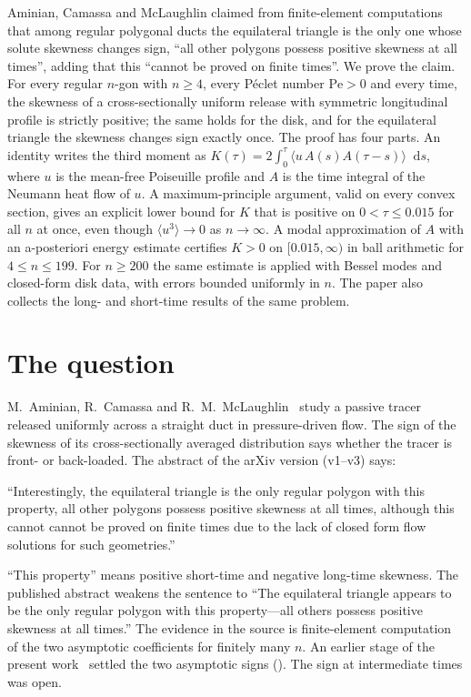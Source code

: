\documentclass[11pt,a4paper]{report}
\DeclareRobustCommand*{\dd}{\mathop{}\!\mathrm{d}}
\begin{document}
\makepapertitle

\begin{paperabstract}
Aminian, Camassa and McLaughlin claimed from finite-element computations that among regular polygonal ducts the
equilateral triangle is the only one whose solute skewness changes sign, ``all other polygons possess positive
skewness at all times'', adding that this ``cannot be proved on finite times''. We prove the claim. For every regular
\(n\)-gon with \(n\ge4\), every Péclet number \(\mathrm{Pe}>0\) and every time, the skewness of a cross-sectionally uniform release with
symmetric longitudinal profile is strictly positive; the same holds for the disk, and for the equilateral triangle
the skewness changes sign exactly once. The proof has four parts. An identity writes the third moment as
\(K(\tau)=2\int_0^\tau\langle u\,A(s)A(\tau-s)\rangle\dd s\), where \(u\) is the mean-free Poiseuille profile and \(A\)
is the time integral of the Neumann heat flow of \(u\). A maximum-principle argument, valid on every convex section,
gives an explicit lower bound for \(K\) that is positive on \(0<\tau\le0.015\) for all \(n\) at once, even though
\(\langle u^3\rangle\to0\) as \(n\to\infty\). A modal approximation of \(A\) with an a-posteriori energy estimate certifies
\(K>0\) on \([0.015,\infty)\) in ball arithmetic for \(4\le n\le199\). For \(n\ge200\) the same estimate is applied
with Bessel modes and closed-form disk data, with errors bounded uniformly in \(n\). The paper also collects the
long- and short-time results of the same problem.
\end{paperabstract}

\section*{The question}

M.~Aminian, R.~Camassa and R.~M.~McLaughlin~\autocite{ACM2018,ACM2017} study a passive tracer released uniformly across
a straight duct in pressure-driven flow. The sign of the skewness of its cross-sectionally averaged distribution
says whether the tracer is front- or back-loaded. The abstract of the arXiv version (v1--v3) says:
\begin{openquote}
``Interestingly, the equilateral triangle is the only regular polygon with this property, all other polygons possess
positive skewness at all times, although this cannot cannot be proved on finite times due to the lack of closed form
flow solutions for such geometries.''
\end{openquote}
``This property'' means positive short-time and negative long-time skewness. The published abstract weakens the
sentence to ``The equilateral triangle appears to be the only regular polygon with this property---all others possess
positive skewness at all times.'' The evidence in the source is finite-element computation of the two asymptotic
coefficients for finitely many \(n\). An earlier stage of the present work~\autocite{Result14} settled the two
asymptotic signs (). The sign at intermediate times was open.
\end{document}
